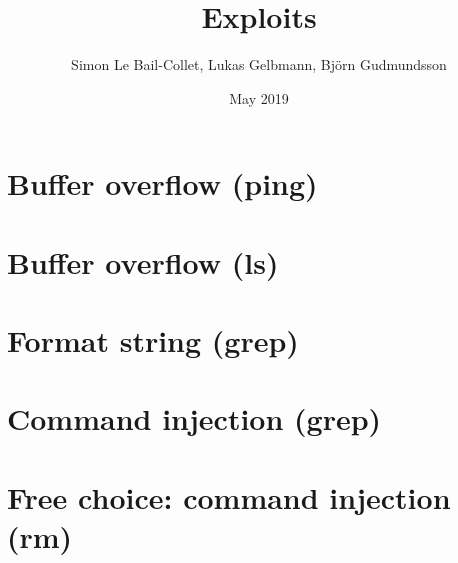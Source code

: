 \documentclass{article}
\title{Exploits}
\author{Simon Le Bail-Collet, Lukas Gelbmann, Björn Gudmundsson}
\date{May 2019}
\begin{document}
\maketitle

\section{Buffer overflow (ping)}

\section{Buffer overflow (ls)}

\section{Format string (grep)}

\section{Command injection (grep)}

\section{Free choice: command injection (rm)}
\end{document}
